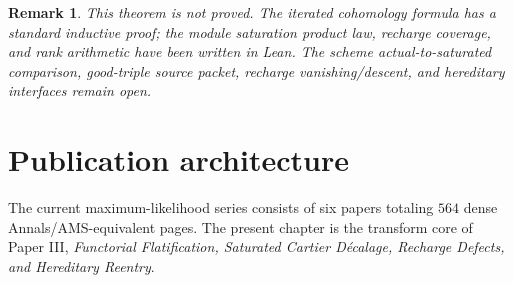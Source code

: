 \documentclass[11pt]{amsart}
\newtheorem{remark}[theorem]{Remark}
\begin{document}
\begin{remark}
This theorem is not proved.  The iterated cohomology formula has a standard
inductive proof; the module saturation product law, recharge coverage, and rank
arithmetic have been written in Lean.  The scheme actual-to-saturated
comparison, good-triple source packet, recharge vanishing/descent, and
hereditary interfaces remain open.
\end{remark}

\section{Publication architecture}
The current maximum-likelihood series consists of six papers totaling $564$
dense Annals/AMS-equivalent pages.  The present chapter is the transform core
of Paper III, \emph{Functorial Flatification, Saturated Cartier D\'ecalage,
Recharge Defects, and Hereditary Reentry}.
\end{document}
